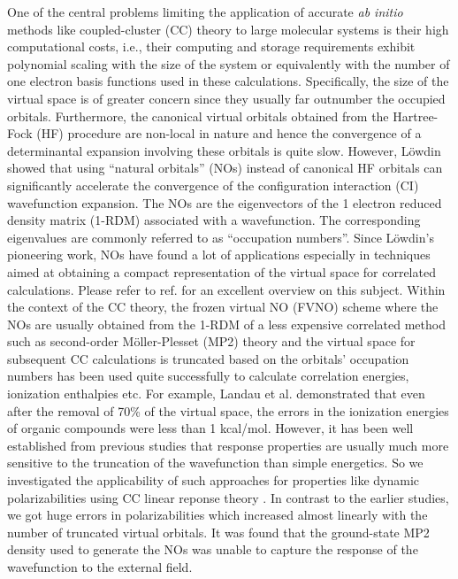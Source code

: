 One of the central problems limiting the application of accurate {\em ab
initio} methods like coupled-cluster (CC) theory to large molecular systems is their high 
computational costs, i.e., their computing and storage requirements 
exhibit polynomial scaling with the size of the system or equivalently
with the number of one electron basis functions used in these calculations.
Specifically, the size of the virtual space is of greater concern since  
they usually far outnumber the occupied orbitals. Furthermore, the canonical virtual orbitals
obtained from the Hartree-Fock (HF) procedure are non-local in nature and hence 
the convergence of a determinantal expansion involving these orbitals
is quite slow. However, L{\"o}wdin \cite{}showed that using 
``natural orbitals'' (NOs) instead of canonical HF orbitals can significantly 
accelerate the convergence of the configuration interaction (CI)
wavefunction expansion. The NOs are the eigenvectors of the 
1 electron reduced density matrix (1-RDM) associated with a wavefunction. 
The corresponding eigenvalues are commonly referred to 
as ``occupation numbers''. Since L{\"o}wdin's pioneering 
work, NOs have found a lot of applications especially in techniques 
aimed at obtaining a compact representation of the virtual space for 
correlated calculations.\cite{} Please refer to ref. \cite{Landau10}
for an excellent overview on this subject. Within the context of the CC theory, 
the frozen virtual NO (FVNO) scheme where the NOs are usually obtained from 
the 1-RDM of a less expensive correlated method such as second-order 
M{\"o}ller-Plesset (MP2) theory and the virtual space for subsequent 
CC calculations is truncated based on the orbitals' occupation 
numbers has been used quite successfully to calculate correlation energies, 
ionization enthalpies etc\cite{}. For example, Landau et al.\cite{} demonstrated 
that even after the removal of 70\% of the virtual space, the errors in
the ionization energies of organic compounds were less than 1 kcal/mol.
However, it has been well established from previous studies that response 
properties are usually much more sensitive to the truncation of the wavefunction 
than simple energetics\cite{}. So we investigated the applicability of such 
approaches for properties like dynamic polarizabilities using CC linear reponse theory
\cite{}. In contrast to the earlier studies, we got huge errors in polarizabilities 
which increased almost linearly with the number of truncated virtual orbitals. 
It was found that the ground-state MP2 density used to generate the NOs was 
unable to capture the response of the wavefunction to the external field. 
